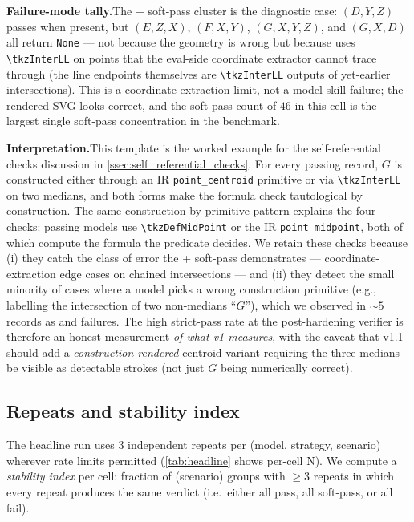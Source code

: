 \noindent\textbf{Failure-mode tally.}\quad The \opus + \rawcode soft-pass cluster is the diagnostic case: $(D, Y, Z)$ passes when present, but $(E, Z, X)$, $(F, X, Y)$, $(G, X, Y, Z)$, and $(G, X, D)$ all return \texttt{None} --- not because the geometry is wrong but because \opus uses \texttt{\textbackslash tkzInterLL} on points that the eval-side coordinate extractor cannot trace through (the line endpoints themselves are \texttt{\textbackslash tkzInterLL} outputs of yet-earlier intersections).
This is a coordinate-extraction limit, not a model-skill failure; the rendered SVG looks correct, and the soft-pass count of $46$ in this cell is the largest single soft-pass concentration in the benchmark.

\noindent\textbf{Interpretation.}\quad This template is the worked example for the self-referential checks discussion in \cref{ssec:self_referential_checks}.
For every passing record, $G$ is constructed either through an IR \texttt{point\_centroid} primitive or via \texttt{\textbackslash tkzInterLL} on two medians, and both forms make the  formula check tautological by construction.
The same construction-by-primitive pattern explains the four  checks: passing models use \texttt{\textbackslash tkzDefMidPoint} or the IR \texttt{point\_midpoint}, both of which compute the formula the predicate decides.
We retain these checks because (i) they catch the class of error the \opus + \rawcode soft-pass demonstrates --- coordinate-extraction edge cases on chained intersections --- and (ii) they detect the small minority of cases where a model picks a wrong construction primitive (e.g., labelling the intersection of two non-medians ``$G$''), which we observed in $\sim 5$ records as  and  failures.
The high strict-pass rate at the post-hardening verifier is therefore an honest measurement \emph{of what v1 measures}, with the caveat that v1.1 should add a \emph{construction-rendered} centroid variant requiring the three medians be visible as detectable strokes (not just $G$ being numerically correct).

\subsection{Repeats and stability index}
\label{app:case_studies:stability}

The headline run uses $3$ independent repeats per (model, strategy, scenario) wherever rate limits permitted (\cref{tab:headline} shows per-cell N).
We compute a \emph{stability index} per cell: fraction of (scenario) groups with $\geq 3$ repeats in which every repeat produces the same verdict (i.e.\ either all pass, all soft-pass, or all fail).

